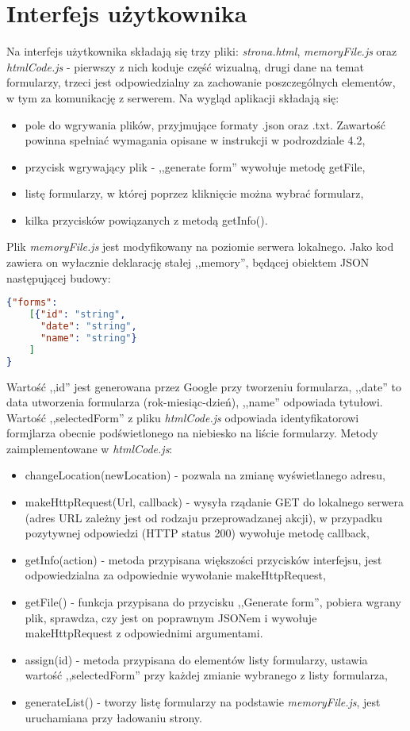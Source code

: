 \section{Interfejs użytkownika}%
Na interfejs użytkownika składają się trzy pliki: \textit{strona.html}, \textit{memoryFile.js} oraz \textit{htmlCode.js} - pierwszy z nich koduje część wizualną, drugi dane na temat formularzy, trzeci jest odpowiedzialny za zachowanie poszczególnych elementów, w tym za komunikację z serwerem. 
\ind Na wygląd aplikacji składają się:
\begin{itemize}
\item pole do wgrywania plików, przyjmujące formaty .json oraz .txt. Zawartość powinna spełniać wymagania opisane w instrukcji w podrozdziale 4.2, %
\item przycisk wgrywający plik - ,,generate form'' wywołuje metodę getFile,
\item listę formularzy, w której poprzez kliknięcie można wybrać formularz,
\item kilka przycisków powiązanych z metodą getInfo().
\end{itemize}
\ind Plik \textit{memoryFile.js} jest modyfikowany na poziomie serwera lokalnego. Jako kod zawiera on wyłacznie deklarację stałej ,,memory'', będącej obiektem JSON następującej budowy:
\begin{lstlisting}[language=json,firstnumber=1]
{"forms":
    [{"id": "string",
      "date": "string",
      "name": "string"}
    ]
}
\end{lstlisting}
Wartość ,,id'' jest generowana przez Google przy tworzeniu formularza, ,,date'' to data utworzenia formularza (rok-miesiąc-dzień), ,,name'' odpowiada tytułowi.
\ind Wartość ,,selectedForm'' z pliku \textit{htmlCode.js} odpowiada identyfikatorowi formjlarza obecnie podświetlonego na niebiesko na liście formularzy. Metody zaimplementowane w \textit{htmlCode.js}:
\begin{itemize}
\item changeLocation(newLocation) - pozwala na zmianę wyświetlanego adresu,
\item makeHttpRequest(Url, callback) - wysyła rządanie GET do lokalnego serwera (adres URL zależny jest od rodzaju przeprowadzanej akcji), w przypadku pozytywnej odpowiedzi (HTTP status 200) wywołuje metodę callback,
\item getInfo(action) - metoda przypisana większości przycisków interfejsu, jest odpowiedzialna za odpowiednie wywołanie makeHttpRequest,
\item getFile() - funkcja przypisana do przycisku ,,Generate form'', pobiera wgrany plik, sprawdza, czy jest on poprawnym JSONem i wywołuje makeHttpRequest z odpowiednimi argumentami.
\item assign(id) - metoda przypisana do elementów listy formularzy, ustawia wartość ,,selectedForm'' przy każdej zmianie wybranego z listy formularza,
\item generateList() - tworzy listę formularzy na podstawie \textit{memoryFile.js}, jest uruchamiana przy ładowaniu strony.
\end{itemize}

